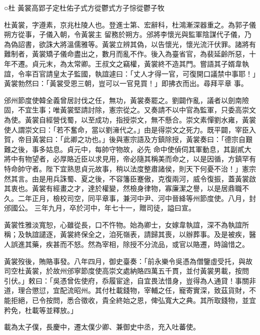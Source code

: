
\begin{pinyinscope}

 ○杜
 黃裳高郢子定杜佑子式方從鬱式方子悰從鬱子牧



 杜黃裳，字遵素，京兆杜陵人也。登進士第、宏辭科，杜鴻漸深器重之。為郭子儀朔方從事，子儀入朝，令黃裳主
 留務於朔方。邠將李懷光與監軍陰謀代子儀，乃為偽詔書，欲誅大將溫儒雅等。黃裳立辨其偽，以告懷光，懷光流汗伏罪。諸將有難制者，黃裳矯子儀命盡出之，數月而亂不作。後入為臺省官，為裴延齡所惡，十年不遷。貞元末，為太常卿。王叔文之竊權，黃裳終不造其門。嘗語其子婿韋執誼，令率百官請皇太子監國，執誼遽曰：「丈人才得一官，可復開口議禁中事耶！」黃裳勃然曰：「黃裳受恩三朝，豈可以一官見買！」即拂衣而出。尋拜平章
 事。



 邠州節度使韓全義曾居討伐之任，無功，黃裳奏罷之。劉闢作亂，議者以劍南險固，不宜生事；唯黃裳堅請討除，憲宗從之。又奏請不以中官為監軍，只委高崇文為使。黃裳自經營伐蜀，以至成功，指授崇文，無不懸合。崇文素憚劉水雍，黃裳使人謂崇文曰：「若不奮命，當以劉澭代之。」由是得崇文之死力。既平闢，宰臣入賀，帝目黃裳曰：「此卿之功也。」後與憲宗語及方鎮除授，黃裳奏曰：「德宗自艱難之後，事多姑息。貞元中，每帥守物故，必先
 命中使偵伺其軍動息，其副貳大將中有物望者，必厚賂近臣以求見用，帝必隨其稱美而命之，以是因循，方鎮罕有特命帥守者。陛下宜熟思貞元故事，稍以法度整肅諸侯，則天下何憂不治！」憲宗然其言。由是用兵誅蜀、夏之後，不容籓臣蹇傲，克復兩河，威令復振，蓋黃裳啟其衷也。黃裳有經畫之才，達於權變，然檢身律物，寡廉潔之譽，以是居鼎職不久。二年正月，檢校司空，同平章事，兼河中尹、河中晉絳等州節度使。八月，封邠國公。
 三年九月，卒於河中，年七十一，贈司徒，謚曰宣。



 黃裳性雅淡寬恕，心雖從長，口不忤物。始為卿士，女嫁韋執誼，深不為執誼所稱；及執誼譴逐，黃裳終保全之，洎死嶺表，請歸其喪，以辦葬事。及是被疾，醫人誤進其藥，疾甚而不怒。然為宰相，除授不分流品，或官以賂遷，時論惜之。



 黃裳歿後，賄賂事發。八年四月，御史臺奏：「前永樂令吳憑為僧鑒虛受托，與故司空杜黃裳，於故州邠寧節度使高崇文處納賂四萬五千貫，並付黃裳男載，按問
 引伏。」敕曰：「吳憑曾佐使府，忝履宦途，自宜畏法惜身，豈得為人通貸！事關非道，理合懲愆，宜配流昭州。其付杜載錢物，宰輔之任，寵寄實深，致茲貨財，不能拒絕，已令按問，悉合徵收，貴全終始之恩，俾弘寬大之典。其所取錢物，並宜矜免，杜載等並釋放。」



 載為太子僕，長慶中，遷太僕少卿、兼御史中丞，充入吐蕃使。




\end{pinyinscope}
